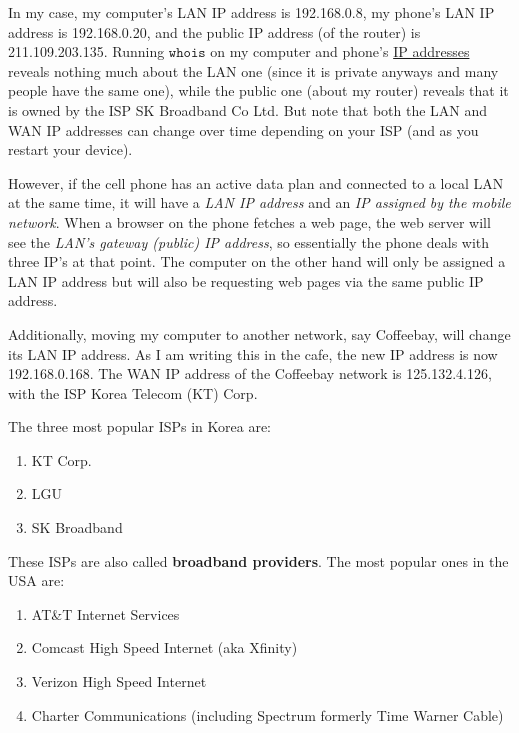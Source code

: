 \documentclass{article}
\newcounter{example}[section]
\begin{document}
  \begin{example}
    \label{ex:lan-and-public-ip-addresses}
  In my case, my computer's LAN IP address is 192.168.0.8, my phone's LAN IP address is 192.168.0.20, and the public IP address (of the router) is 211.109.203.135. Running $\texttt{whois}$ on my computer and phone's \hyperref[def:ip-addresses]{IP addresses} reveals nothing much about the LAN one (since it is private anyways and many people have the same one), while the public one (about my router) reveals that it is owned by the ISP SK Broadband Co Ltd. But note that both the LAN and WAN IP addresses can change over time depending on your ISP (and as you restart your device). 

  However, if the cell phone has an active data plan and connected to a local LAN at the same time, it will have a \textit{LAN IP address} and an \textit{IP assigned by the mobile network}. When a browser on the phone fetches a web page, the web server will see the \textit{LAN’s gateway (public) IP address}, so essentially the phone deals with three IP’s at that point. The computer on the other hand will only be assigned a LAN IP address but will also be requesting web pages via the same public IP address. 

  Additionally, moving my computer to another network, say Coffeebay, will change its LAN IP address. As I am writing this in the cafe, the new IP address is now 192.168.0.168. The WAN IP address of the Coffeebay network is 125.132.4.126, with the ISP Korea Telecom (KT) Corp. 
  \end{example}

  The three most popular ISPs in Korea are: 
  \begin{enumerate}
      \item KT Corp. 
      \item LGU
      \item SK Broadband 
  \end{enumerate}
  These ISPs are also called \textbf{broadband providers}. The most popular ones in the USA are:
  \begin{enumerate}
      \item AT\&T Internet Services
      \item Comcast High Speed Internet (aka Xfinity)
      \item Verizon High Speed Internet
      \item Charter Communications (including Spectrum formerly Time Warner Cable)
  \end{enumerate}
\end{document}
